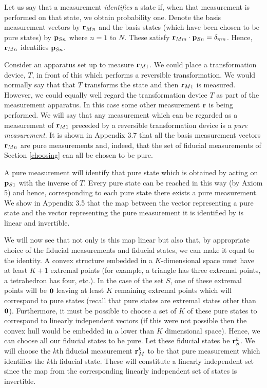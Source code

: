 \documentclass[12pt]{article}
\begin{document}
Let us say that a measurement {\it identifies} a state if, when that
measurement is performed on that state, we obtain probability one.
Denote the basis measurement vectors by ${\bf r}_{Mn}$ and the basis
states (which have been chosen to be pure states)
by ${\bf p}_{Sn}$ where $n=1$ to $N$. These satisfy
${\bf r}_{Mm}\cdot{\bf p}_{Sn}=\delta_{mn}$. Hence,
${\bf r}_{Mn}$ identifies ${\bf p}_{Sn}$.

Consider an apparatus set up to measure ${\bf r}_{M1}$.  We could place
a transformation device,  $T$, in front of this which performs a reversible
transformation.  We would normally say that that $T$ transforms the
state and then ${\bf r}_{M1}$ is measured.  However, we could equally
well regard the transformation device $T$ as part of the measurement
apparatus.  In this case some other measurement ${\bf r}$ is being
performed.  We will say that any measurement which can be regarded as a
measurement of ${\bf r}_{M1}$ preceded by a reversible transformation
device is a {\it pure measurement}.  It is shown in Appendix 3.7 that all
the basis measurement vectors ${\bf r}_{Mn}$ are pure measurements and,
indeed, that the set of fiducial measurements of Section \ref{choosing}
can all be chosen to be pure.

A pure measurement will
identify that pure state which is obtained by acting on ${\bf p}_{S1}$
with the inverse of $T$. Every pure state can be reached in this
way (by Axiom 5) and hence, corresponding to each pure state there
exists a pure measurement.  We show in Appendix 3.5 that the map between
the vector representing a pure state and the vector representing
the pure measurement it is identified by  is linear and invertible.

We will now see that not only is this map linear but also that, by
appropriate choice of the fiducial measurements and fiducial states, we
can make it equal to the identity.
A convex structure embedded in a $K$-dimensional space must have at
least $K+1$ extremal points (for example, a triangle has three extremal
points, a tetrahedron has four, etc.). In the case of the set $S$, one
of these extremal points will be ${\bf 0}$ leaving at least $K$
remaining extremal points which will correspond to pure states (recall
that pure states are extremal states other than ${\bf 0}$).
Furthermore, it must be possible to choose a set of $K$ of these
pure states to correspond to linearly independent vectors (if this
were not possible then the convex hull would be embedded in a lower than
$K$ dimensional space).
Hence, we can choose all our fiducial states to be pure.
Let these fiducial states be ${\bf r}^k_S$. We will choose
the $k$th fiducial measurement ${\bf r}^k_M$ to be that pure measurement which
identifies the $k$th fiducial state. These will constitute a linearly
independent set since the map from the corresponding linearly
independent set of states is invertible.
\end{document}
